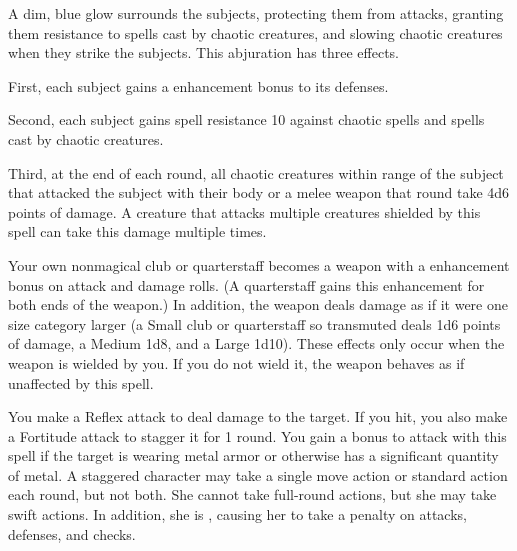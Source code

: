 \spelldur{\durshort \dismissable}
\spelleffect A dim, blue glow surrounds the subjects, protecting them from attacks, granting them resistance to spells cast by chaotic creatures, and slowing chaotic creatures when they strike the subjects. This abjuration has three effects.
\par First, each subject gains a  enhancement bonus to its defenses.
\par Second, each subject gains spell resistance 10 against chaotic spells and spells cast by chaotic creatures.
\par Third, at the end of each round, all chaotic creatures within \rngclose range of the subject that attacked the subject with their body or a melee weapon that round take 4d6 points of damage. A creature that attacks multiple creatures shielded by this spell can take this damage multiple times.

\spelldur{\durshort}
\spelleffect Your own nonmagical club or quarterstaff becomes a weapon with a  enhancement bonus on attack and damage rolls. \spellbonusscalingdescription (A quarterstaff gains this enhancement for both ends of the weapon.) In addition, the weapon deals damage as if it were one size category larger (a Small club or quarterstaff so transmuted deals 1d6 points of damage, a Medium 1d8, and a Large 1d10).
\spellnotes These effects only occur when the weapon is wielded by you. If you do not wield it, the weapon behaves as if unaffected by this spell.

\spelleffect You make a Reflex attack to deal damage to the target. If you hit, you also make a Fortitude attack to stagger it for 1 round. You gain a  bonus to attack with this spell if the target is wearing metal armor or otherwise has a significant quantity of metal.
\spellnotes A staggered character may take a single move action or standard action each round, but not both. She cannot take full-round actions, but she may take swift actions. In addition, she is \vulnerable, causing her to take a  penalty on attacks, defenses, and checks.


